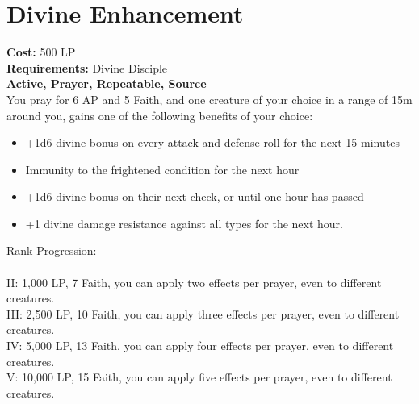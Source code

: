 \section{Divine Enhancement}\label{prayer:divineEnhancement}
\textbf{Cost:} 500 LP\\
\textbf{Requirements:} Divine Disciple \\
\textbf{Active, Prayer, Repeatable, Source}\\
You pray for 6 AP and 5 Faith, and one creature of your choice in a range of 15m around you, gains one of the following benefits of your choice:
\begin{itemize}
	\item +1d6 divine bonus on every attack and defense roll for the next 15 minutes
	\item Immunity to the frightened condition for the next hour
	\item +1d6 divine bonus on their next check, or until one hour has passed
	\item +1 divine damage resistance against all types for the next hour.
\end{itemize}

Rank Progression:\\
\\
II: 1,000 LP, 7 Faith, you can apply two effects per prayer, even to different creatures.\\
III: 2,500 LP, 10 Faith, you can apply three effects per prayer, even to different creatures.\\
IV: 5,000 LP, 13 Faith, you can apply four effects per prayer, even to different creatures.\\
V: 10,000 LP, 15 Faith, you can apply five effects per prayer, even to different creatures.\\